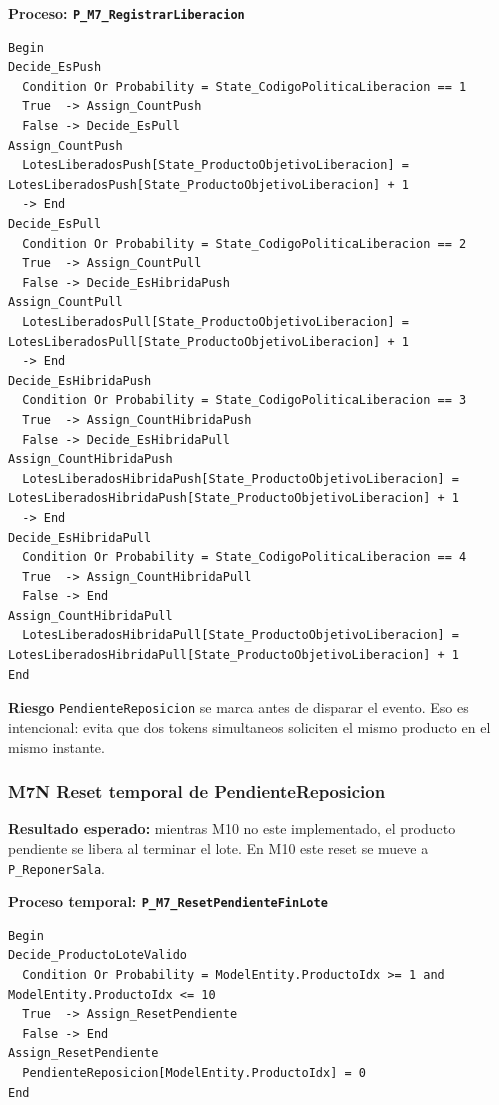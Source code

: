 \documentclass[11pt]{article}
\newcommand{\state}[1]{\texttt{#1}}
\newcommand{\proc}[1]{\texttt{#1}}
\newcommand{\risk}{\textcolor{rojoriesgo}{\textbf{Riesgo}}}
\begin{document}
\textbf{Proceso: \proc{P\_M7\_RegistrarLiberacion}}

\begin{lstlisting}[caption={Bloques de P M7 RegistrarLiberacion}]
Begin
Decide_EsPush
  Condition Or Probability = State_CodigoPoliticaLiberacion == 1
  True  -> Assign_CountPush
  False -> Decide_EsPull
Assign_CountPush
  LotesLiberadosPush[State_ProductoObjetivoLiberacion] = LotesLiberadosPush[State_ProductoObjetivoLiberacion] + 1
  -> End
Decide_EsPull
  Condition Or Probability = State_CodigoPoliticaLiberacion == 2
  True  -> Assign_CountPull
  False -> Decide_EsHibridaPush
Assign_CountPull
  LotesLiberadosPull[State_ProductoObjetivoLiberacion] = LotesLiberadosPull[State_ProductoObjetivoLiberacion] + 1
  -> End
Decide_EsHibridaPush
  Condition Or Probability = State_CodigoPoliticaLiberacion == 3
  True  -> Assign_CountHibridaPush
  False -> Decide_EsHibridaPull
Assign_CountHibridaPush
  LotesLiberadosHibridaPush[State_ProductoObjetivoLiberacion] = LotesLiberadosHibridaPush[State_ProductoObjetivoLiberacion] + 1
  -> End
Decide_EsHibridaPull
  Condition Or Probability = State_CodigoPoliticaLiberacion == 4
  True  -> Assign_CountHibridaPull
  False -> End
Assign_CountHibridaPull
  LotesLiberadosHibridaPull[State_ProductoObjetivoLiberacion] = LotesLiberadosHibridaPull[State_ProductoObjetivoLiberacion] + 1
End
\end{lstlisting}

\risk{} \state{PendienteReposicion} se marca antes de disparar el evento. Eso es intencional: evita que dos tokens simultaneos soliciten el mismo producto en el mismo instante.

\subsubsection{M7N Reset temporal de PendienteReposicion}
\textbf{Resultado esperado:} mientras M10 no este implementado, el producto pendiente se libera al terminar el lote. En M10 este reset se mueve a \proc{P\_ReponerSala}.

\textbf{Proceso temporal: \proc{P\_M7\_ResetPendienteFinLote}}

\begin{lstlisting}[caption={Bloques de P M7 ResetPendienteFinLote}]
Begin
Decide_ProductoLoteValido
  Condition Or Probability = ModelEntity.ProductoIdx >= 1 and ModelEntity.ProductoIdx <= 10
  True  -> Assign_ResetPendiente
  False -> End
Assign_ResetPendiente
  PendienteReposicion[ModelEntity.ProductoIdx] = 0
End
\end{lstlisting}
\end{document}
